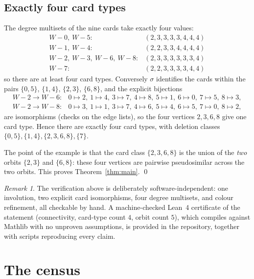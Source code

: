 \documentclass[11pt]{article}
\theoremstyle{remark}
\newtheorem{remark}[theorem]{Remark}
\begin{document}
\subsection{Exactly four card types}

The degree multisets of the nine cards take exactly four values:
\[
\begin{array}{ll}
W - 0,\ W - 5: & (2,3,3,3,3,4,4,4) \\
W - 1,\ W - 4: & (2,2,3,3,4,4,4,4) \\
W - 2,\ W - 3,\ W - 6,\ W - 8: & (2,3,3,3,3,3,3,4) \\
W - 7: & (2,2,3,3,3,3,4,4)
\end{array}
\]
so there are at least four card types. Conversely $\sigma$ identifies the
cards within the pairs $\{0,5\}$, $\{1,4\}$, $\{2,3\}$, $\{6,8\}$, and the
explicit bijections
\[
\begin{array}{ll}
W-2 \to W-6: & 0\mapsto2,\ 1\mapsto4,\ 3\mapsto7,\ 4\mapsto8,\ 5\mapsto1,\
6\mapsto0,\ 7\mapsto5,\ 8\mapsto3,\\
W-2 \to W-8: & 0\mapsto3,\ 1\mapsto1,\ 3\mapsto7,\ 4\mapsto6,\ 5\mapsto4,\
6\mapsto5,\ 7\mapsto0,\ 8\mapsto2,
\end{array}
\]
are isomorphisms (checks on the edge lists), so the four vertices
$2, 3, 6, 8$ give one card type. Hence there are exactly four card types,
with deletion classes $\{0,5\}, \{1,4\}, \{2,3,6,8\}, \{7\}$.

The point of the example is that the card class $\{2,3,6,8\}$ is the union
of the \emph{two} orbits $\{2,3\}$ and $\{6,8\}$: these four vertices are
pairwise pseudosimilar across the two orbits. This proves
Theorem~\ref{thm:main}. \qed

\begin{remark}
The verification above is deliberately software-independent: one involution,
two explicit card isomorphisms, four degree multisets, and colour
refinement, all checkable by hand. A machine-checked Lean~4 certificate of
the statement (connectivity, card-type count $4$, orbit count $5$), which
compiles against Mathlib with no unproven assumptions, is provided in the
repository, together with scripts reproducing every claim.
\end{remark}

\section{The census}\label{sec:census}
\end{document}
